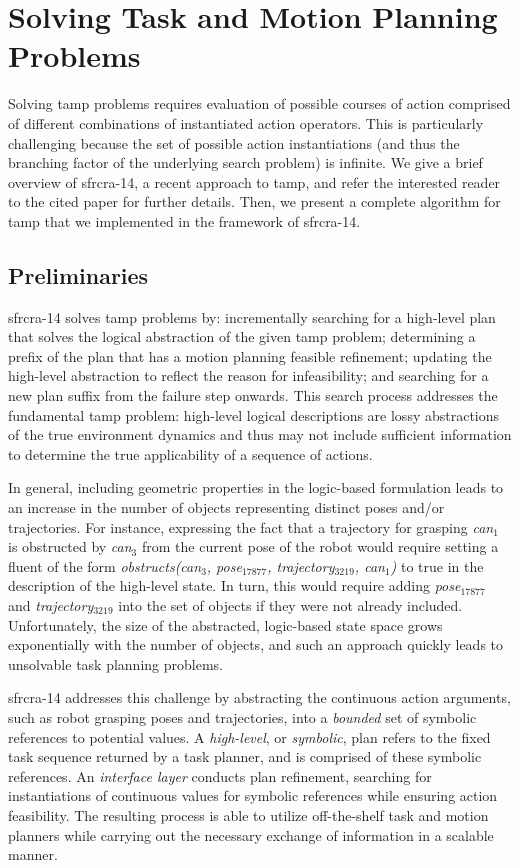 \section{Solving Task and Motion Planning Problems}
Solving {\sc tamp} problems requires evaluation of
possible courses of action comprised of different combinations of
instantiated action operators. This is particularly challenging
because the set of possible action instantiations (and thus the
branching factor of the underlying search problem) is infinite.
We give a brief overview of {\sc sfrcra-14}, a recent approach to {\sc tamp}, and
refer the interested reader to the cited paper for further details.
Then, we present a complete algorithm for {\sc tamp} that we implemented in
the framework of {\sc sfrcra-14}.

\subsection{Preliminaries}
{\sc sfrcra-14} solves {\sc tamp} problems by: incrementally
searching for a high-level plan that solves the logical abstraction
of the given {\sc tamp} problem; determining a prefix of the plan that has a
motion planning feasible refinement; updating the high-level
abstraction to reflect the reason for infeasibility; and searching for
a new plan suffix from the failure step onwards. This search process
addresses the fundamental {\sc tamp} problem: high-level
logical descriptions are lossy abstractions of the true environment
dynamics and thus may not include sufficient information to
determine the true applicability of a sequence of actions.

In general, including geometric properties in the logic-based formulation leads to an
increase in the number of objects representing distinct poses and/or trajectories. For
instance, expressing the fact that a trajectory for grasping \emph{can$_1$} is obstructed by
\emph{can$_3$} from the current pose of the robot would require setting a fluent of the
form \emph{obstructs(can$_3$, pose$_{17877}$, trajectory$_{3219}$, can$_1$)} to true in
the description of the high-level state. In turn, this would require adding
\emph{pose$_{17877}$} and \emph{trajectory$_{3219}$} into the set of objects if they were
not already included. Unfortunately, the size of the abstracted, logic-based state space
grows exponentially with the number of objects, and such an approach quickly leads to
unsolvable task planning problems.

{\sc sfrcra-14} addresses this challenge by abstracting the continuous
action arguments, such as robot grasping poses and trajectories, into
a \emph{bounded} set of symbolic references to potential values. A
\emph{high-level}, or \emph{symbolic}, plan refers to the fixed task
sequence returned by a task planner, and is comprised of these symbolic
references. An \emph{interface layer} conducts plan refinement,
searching for instantiations of continuous values for symbolic
references while ensuring action feasibility.  The resulting process
is able to utilize off-the-shelf task and motion planners while
carrying out the necessary exchange of information in a scalable
manner.

